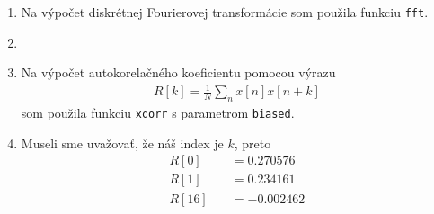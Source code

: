 \documentclass[10pt, a4paper, twocolumn]{article}
\begin{document}
\begin{enumerate}[leftmargin=*]
\item Na výpočet diskrétnej Fourierovej transformácie som použila funkciu \texttt{fft}.
\begin{figure}[H]
\centering
{}
\end{figure}

\item

\item Na výpočet autokorelačného koeficientu pomocou výrazu 
\begin{align}
R[k] = \frac{1}{N}\sum\limits_n x[n]x[n+k]\nonumber
\end{align}
 som použila funkciu \texttt{xcorr} s parametrom \texttt{biased}.
\begin{figure}[H]
\centering
{}
\end{figure}

\item Museli sme uvažovať, že náš index je $k$, preto
\begin{align}
R[0] \quad&= 0.270576 \nonumber \\
R[1] \quad&= 0.234161 \nonumber \\
R[16] \quad&= -0.002462\nonumber
\end{align}


\end{enumerate}
\end{document}
